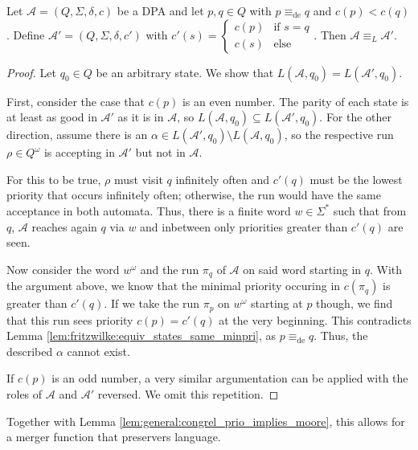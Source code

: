 \begin{theorem} 
\label{thm:fritzwilke:combine_priorities}
	Let $\mathcal{A} = (Q, \Sigma, \delta, c)$ be a DPA and let $p, q \in Q$ with $p \equiv_\text{de} q$ and $c(p) < c(q)$. Define $\mathcal{A}' = (Q, \Sigma, \delta, c')$ with $c'(s) = \begin{cases} c(p) & \text{if } s = q \\ c(s) & \text{else} \end{cases}$. Then $\mathcal{A} \equiv_L \mathcal{A}'$.
\end{theorem}

\begin{proof}
	Let $q_0 \in Q$ be an arbitrary state. We show that $L(\mathcal{A}, q_0) = L(\mathcal{A}', q_0)$.
	
	First, consider the case that $c(p)$ is an even number. The parity of each state is at least as good in $\mathcal{A}'$ as it is in $\mathcal{A}$, so $L(\mathcal{A}, q_0) \subseteq L(\mathcal{A}', q_0)$. For the other direction, assume there is an $\alpha \in L(\mathcal{A}', q_0) \setminus L(\mathcal{A}, q_0)$, so the respective run $\rho \in Q^\omega$ is accepting in $\mathcal{A}'$ but not in $\mathcal{A}$. 
	
	For this to be true, $\rho$ must visit $q$ infinitely often and $c'(q)$ must be the lowest priority that occurs infinitely often; otherwise, the run would have the same acceptance in both automata. Thus, there is a finite word $w \in \Sigma^*$ such that from $q$, $\mathcal{A}$ reaches again $q$ via $w$ and inbetween only priorities greater than $c'(q)$ are seen.
	
	Now consider the word $w^\omega$ and the run $\pi_q$ of $\mathcal{A}$ on said word starting in $q$. With the argument above, we know that the minimal priority occuring in $c(\pi_q)$ is greater than $c'(q)$. If we take the run $\pi_p$ on $w^\omega$ starting at $p$ though, we find that this run sees priority $c(p) = c'(q)$ at the very beginning. This contradicts Lemma \ref{lem:fritzwilke:equiv_states_same_minpri}, as $p \equiv_\text{de} q$. Thus, the described $\alpha$ cannot exist. 
	
	If $c(p)$ is an odd number, a very similar argumentation can be applied with the roles of $\mathcal{A}$ and $\mathcal{A}'$ reversed. We omit this repetition.
\end{proof}

\vspace{5pt}

Together with Lemma \ref{lem:general:congrel_prio_implies_moore}, this allows for a merger function that preservers language.

